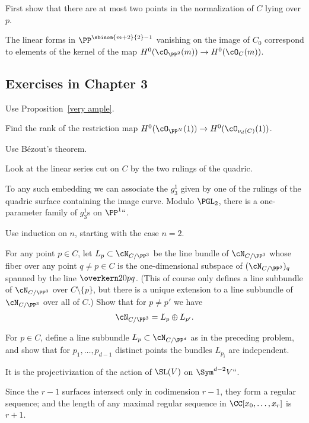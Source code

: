 First show that there are at most two points in the normalization of
$C$ lying over $p$.

The linear forms in $\PP^{\sbinom{m+2}{2} - 1}$ vanishing on the image
of $C_0$ correspond to elements of the kernel of the map
$H^0(\cO_{\PP^2}(m)) \to H^0(\cO_{C}(m))$.

\subsection*{Exercises in Chapter 3\nopunct}

Use Proposition~\ref{very ample}.

Find the rank of the restriction map
$H^0(\cO_{\PP^N}(1)) \to H^0(\cO_{\nu_d(C)}(1))$.

Use B\'ezout's theorem.
%

Look at the linear series cut on $C$ by the two rulings of the quadric.

To any such embedding we can associate the $g^1_3$ given by one of the
rulings of the quadric surface containing the image curve. Modulo
$\PGL_2$, there is a one-parameter family of $g^1_3$s on $\PP^1` `$.

 Use induction on $n$, starting with the case $n=2$.

 For any point $p \in C$, let $L_p \subset \cN_{C/\PP^3}$ be the
%
line bundle
of $\cN_{C/\PP^3}$ whose fiber over any point $q \neq p \in C$ is the
one-dimensional subspace of $(\cN_{C/\PP^3})_q$ spanned by the line
$\overkern20{pq}$. (This of course only defines a line subbundle of
$\cN_{C/\PP^3}$ over $C \setminus \{p\}$, but there is a unique
extension to a line subbundle of $\cN_{C/\PP^3}$ over all of $C$.)
Show that for $p \neq p'$ we have
$$
\cN_{C/\PP^3} = L_p \oplus L_{p'}.
$$

For $p \in C$, define a line subbundle $L_p \subset \cN_{C/\PP^d}$ as
in the preceding problem, and show that for $p_1,\dots,p_{d-1}$
distinct points the bundles $L_{p_i}$ are independent.

It is the projectivization of the action of $\SL(V)$ on $\Sym^{d-2}V` `$.

Since the $r-1$ surfaces intersect only in codimension $r-1$, they form
a regular sequence; and the length of any maximal regular sequence in
$\CC[x_0,\dots, x_r]$ is $r+1$.

